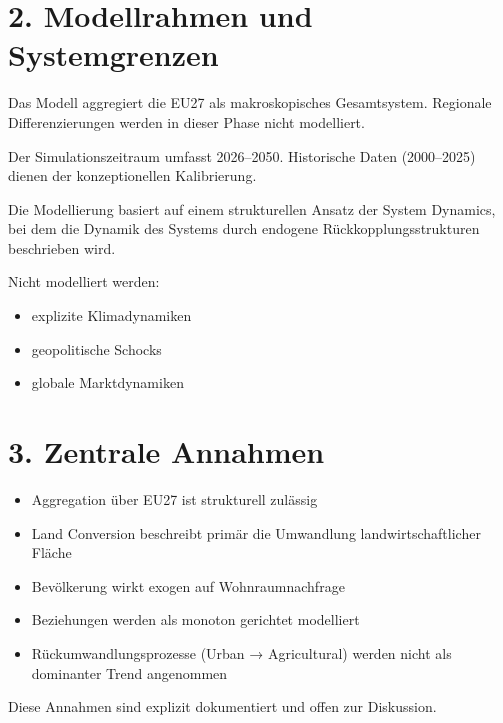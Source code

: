 \documentclass[10pt, a4paper]{article}
\begin{document}
\section*{2. Modellrahmen und Systemgrenzen}
Das Modell aggregiert die EU27 als makroskopisches Gesamtsystem. Regionale Differenzierungen werden in dieser Phase nicht modelliert.

Der Simulationszeitraum umfasst 2026–2050. Historische Daten (2000–2025) dienen der konzeptionellen Kalibrierung.

Die Modellierung basiert auf einem strukturellen Ansatz der System Dynamics, bei dem die Dynamik des Systems durch endogene Rückkopplungsstrukturen beschrieben wird.

Nicht modelliert werden:
\begin{itemize}[itemsep=0pt, topsep=0pt, leftmargin=*]
    \item explizite Klimadynamiken
    \item geopolitische Schocks
    \item globale Marktdynamiken
\end{itemize}

\section*{3. Zentrale Annahmen}
\begin{itemize}[itemsep=0pt, topsep=0pt, leftmargin=*]
    \item Aggregation über EU27 ist strukturell zulässig
    \item Land Conversion beschreibt primär die Umwandlung landwirtschaftlicher Fläche
    \item Bevölkerung wirkt exogen auf Wohnraumnachfrage
    \item Beziehungen werden als monoton gerichtet modelliert
    \item Rückumwandlungsprozesse (Urban → Agricultural) werden nicht als dominanter Trend angenommen
\end{itemize}
Diese Annahmen sind explizit dokumentiert und offen zur Diskussion.
\end{document}
